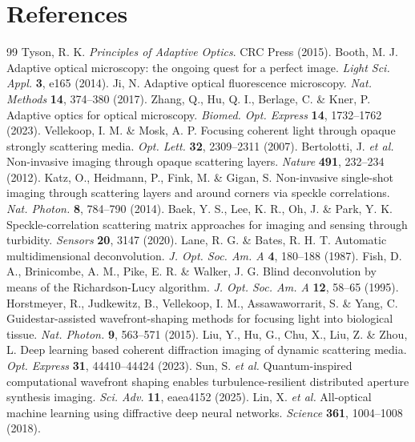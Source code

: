 \documentclass[11pt]{article}
\begin{document}
\section*{References}
\begin{thebibliography}{99}
 Tyson, R. K. \textit{Principles of Adaptive Optics}. CRC Press (2015).
 Booth, M. J. Adaptive optical microscopy: the ongoing quest for a perfect image. \textit{Light Sci. Appl.} \textbf{3}, e165 (2014).
 Ji, N. Adaptive optical fluorescence microscopy. \textit{Nat. Methods} \textbf{14}, 374--380 (2017).
 Zhang, Q., Hu, Q. I., Berlage, C. \& Kner, P. Adaptive optics for optical microscopy. \textit{Biomed. Opt. Express} \textbf{14}, 1732--1762 (2023).
 Vellekoop, I. M. \& Mosk, A. P. Focusing coherent light through opaque strongly scattering media. \textit{Opt. Lett.} \textbf{32}, 2309--2311 (2007).
 Bertolotti, J. \textit{et al.} Non-invasive imaging through opaque scattering layers. \textit{Nature} \textbf{491}, 232--234 (2012).
 Katz, O., Heidmann, P., Fink, M. \& Gigan, S. Non-invasive single-shot imaging through scattering layers and around corners via speckle correlations. \textit{Nat. Photon.} \textbf{8}, 784--790 (2014).
 Baek, Y. S., Lee, K. R., Oh, J. \& Park, Y. K. Speckle-correlation scattering matrix approaches for imaging and sensing through turbidity. \textit{Sensors} \textbf{20}, 3147 (2020).
 Lane, R. G. \& Bates, R. H. T. Automatic multidimensional deconvolution. \textit{J. Opt. Soc. Am. A} \textbf{4}, 180--188 (1987).
 Fish, D. A., Brinicombe, A. M., Pike, E. R. \& Walker, J. G. Blind deconvolution by means of the Richardson-Lucy algorithm. \textit{J. Opt. Soc. Am. A} \textbf{12}, 58--65 (1995).
 Horstmeyer, R., Judkewitz, B., Vellekoop, I. M., Assawaworrarit, S. \& Yang, C. Guidestar-assisted wavefront-shaping methods for focusing light into biological tissue. \textit{Nat. Photon.} \textbf{9}, 563--571 (2015).
 Liu, Y., Hu, G., Chu, X., Liu, Z. \& Zhou, L. Deep learning based coherent diffraction imaging of dynamic scattering media. \textit{Opt. Express} \textbf{31}, 44410--44424 (2023).
 Sun, S. \textit{et al.} Quantum-inspired computational wavefront shaping enables turbulence-resilient distributed aperture synthesis imaging. \textit{Sci. Adv.} \textbf{11}, eaea4152 (2025).
 Lin, X. \textit{et al.} All-optical machine learning using diffractive deep neural networks. \textit{Science} \textbf{361}, 1004--1008 (2018).

\end{thebibliography}
\end{document}
